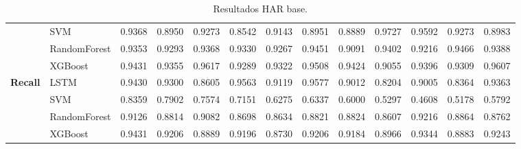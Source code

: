 \begin{table}[h]
\begin{adjustbox}{max width=15cm}
\begin{tabular}{|c|l|r|r|r|r|r|r|r|r|r|r|r|}
			& SVM &  0.9368 &  0.8950 &  0.9273 &  0.8542 &  0.9143 &  0.8951 &  0.8889 &  0.9727 &  0.9592 &  0.9273 &  0.8983 \\
			& RandomForest &  0.9353 &  0.9293 &  0.9368 &  0.9330 &  0.9267 &  0.9451 &  0.9091 &  0.9402 &  0.9216 &  0.9466 &  0.9388 \\
			& XGBoost &  0.9431 &  0.9355 &  0.9617 &  0.9289 &  0.9322 &  0.9508 &  0.9424 &  0.9055 &  0.9396 &  0.9309 &  0.9607 \\
			\hline
			\textbf{Recall} & LSTM &  0.9430 &  0.9300 &  0.8605 &  0.9563 &  0.9119 &  0.9577 &  0.9012 &  0.8204 &  0.9005 &  0.8364 &  0.9363 \\
			& SVM &  0.8359 &  0.7902 &  0.7574 &  0.7151 &  0.6275 &  0.6337 &  0.6000 &  0.5297 &  0.4608 &  0.5178 &  0.5792 \\
			& RandomForest &  0.9126 &  0.8814 &  0.9082 &  0.8698 &  0.8634 &  0.8821 &  0.8824 &  0.8607 &  0.9216 &  0.8864 &  0.8762 \\
			& XGBoost &  0.9431 &  0.9206 &  0.8889 &  0.9196 &  0.8730 &  0.9206 &  0.9184 &  0.8966 &  0.9344 &  0.8883 &  0.9243 \\
			\hline
		\end{tabular}
	\end{adjustbox}
	\caption{Resultados HAR base.}
	\label{tab:HAR_base}
\end{table}
\newpage

